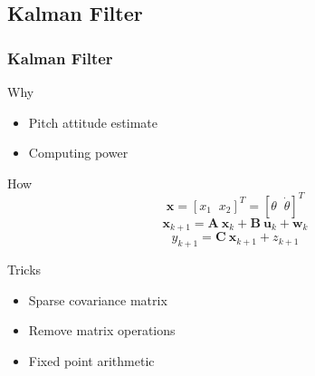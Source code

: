 \subsection*{Kalman Filter}
\begin{frame}
\frametitle{Kalman Filter}
\begin{block}{Why}
\begin{itemize}
\item
Pitch attitude estimate
\item
Computing power
\end{itemize}
\end{block}

\begin{block}{How}
\begin{equation*}
\bm{x} = [x_1\;\;x_2]^T = [\theta\;\;\dot{\theta}]^T
\end{equation*}
\vspace{0.075in}
\begin{equation*}
\bm{x}_{k+1} = \bm{A}\:\bm{x}_k + \bm{B}\:\bm{u}_k + \bm{w}_k
\end{equation*}
\vspace{0.075in}
\begin{equation*}
y_{k+1} = \bm{C}\:\bm{x}_{k+1} + z_{k+1}
\end{equation*}
\end{block}

\begin{block}{Tricks}
\begin{itemize}
\item
\alert{Sparse covariance matrix}
\item
Remove matrix operations
\item
\alert{Fixed point arithmetic}
\end{itemize}
\end{block}
\end{frame}

